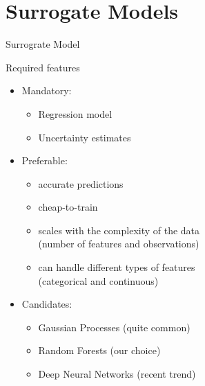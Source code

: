 \section{Surrogate Models}
\begin{frame}[c,fragile]{Surrograte Model}

Required features

\begin{itemize}
	\item Mandatory:
	\begin{itemize}
		\item Regression model
		\item Uncertainty estimates
	\end{itemize}
	\pause
	\item Preferable:
	\begin{itemize}
		\item accurate predictions
		\item cheap-to-train
		\item scales with the complexity of the data\\ (number of features and observations)
		\item can handle different types of features\\ (categorical and continuous)
	\end{itemize}
	\pause
	\medskip
	\item Candidates:
	\begin{itemize}
		\item Gaussian Processes (quite common)
		\item Random Forests (our choice)
		\item Deep Neural Networks (recent trend)
	\end{itemize}
\end{itemize}

\end{frame}
